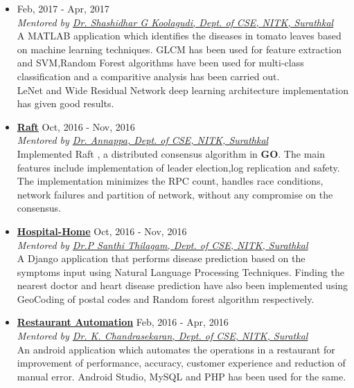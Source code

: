 \documentclass[margin, centered]{res}
\begin{document}
\begin{resume}
\begin{itemize}[leftmargin=*]
 \item \textbf{\color{blue}{Plant Leaf Disease Detection}} \hfill Feb, 2017 - Apr, 2017\\
 \emph{Mentored by \href{http://cse.nitk.ac.in/faculty/shashidhar-g-koolagudi}{Dr. Shashidhar G Koolagudi, Dept. of CSE, NITK, Surathkal}}\\
 A MATLAB application which identifies the diseases in tomato leaves based on machine learning techniques. GLCM has been used for feature extraction and SVM,Random Forest algorithms have been used for multi-class classification and a comparitive analysis has been carried out.\\
 LeNet and Wide Residual Network deep learning architecture implementation has given good results. 
 \item \textbf{\href{https://github.com/PrajwalaTM/Raft-Consensus-Algorithm}{Raft}} \hfill Oct, 2016 - Nov, 2016\\
 \emph{Mentored by \href{http://cse.nitk.ac.in/faculty/annappa}{Dr. Annappa, Dept. of CSE, NITK, Surathkal}} \\
 Implemented Raft , a distributed consensus algorithm in \textbf{GO}. The main features include implementation of leader election,log replication and safety. The implementation minimizes the RPC count, handles race conditions, network failures and partition of network, without any compromise on the consensus.
 \item \textbf{{\href{https://github.com/PrajwalaTM/Hospital-Home}{Hospital-Home}}} \hfill Oct, 2016 - Nov, 2016\\
 \emph{Mentored by \href{http://cse.nitk.ac.in/faculty/p-santhi-thilagam}{Dr.P Santhi Thilagam, Dept. of CSE, NITK, Surathkal}}\\
 A Django application that performs disease prediction based on the symptoms input using Natural Language Processing Techniques. Finding the nearest doctor and heart disease prediction have also been implemented using GeoCoding of postal codes and Random forest algorithm respectively.
 \item \textbf{\href{https://github.com/PrajwalaTM/Android-Projects/} {Restaurant Automation}} \hfill Feb, 2016 - Apr, 2016\\
  \emph{Mentored by \href{http://cse.nitk.ac.in/faculty/k-chandrasekaran}{Dr. K. Chandrasekaran, Dept. of CSE, NITK, Suratkal}}\\
 An android application which automates the operations in a restaurant for improvement of performance, accuracy, customer experience and reduction of manual error. Android Studio, MySQL and PHP has been used for the same.

\end{itemize}
\end{resume}
\end{document}
